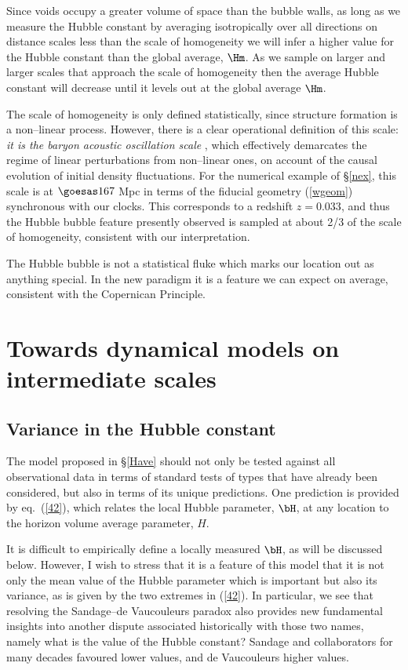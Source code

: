 \documentclass[12pt]{iopart}
\begin{document}
Since voids occupy a greater volume of space than the bubble walls, as
long as we measure the Hubble constant by averaging isotropically over all
directions on distance scales less than the scale of homogeneity we will
infer a higher value for the Hubble constant than the global average, $\Hm$.
As we sample on larger and larger scales that approach the scale of homogeneity
then the average Hubble constant will decrease until it levels out at
the global average $\Hm$.

The scale of homogeneity is only defined statistically, since structure
formation is a non--linear process. However, there is a clear operational
definition of this scale: {\em it is the baryon acoustic oscillation scale}
\cite{bao}, which effectively demarcates the regime of linear
perturbations from non--linear ones, on account of the causal evolution
of initial density fluctuations. For the numerical example of \S\ref{nex},
this scale is at $\goesas167$ Mpc in terms of the fiducial geometry
(\ref{wgeom}) synchronous with our clocks. This corresponds to a redshift
$z=0.033$, and thus the Hubble bubble feature presently observed is
sampled at about 2/3 of the scale of homogeneity, consistent with our
interpretation.

The Hubble bubble is not a statistical fluke which marks our location
out as anything special. In the new paradigm it is a feature we can
expect on average, consistent with the Copernican Principle.

\section{Towards dynamical models on intermediate scales\label{Newton}}

\subsection{Variance in the Hubble constant}

The model proposed in \S\ref{Have} should not only be tested against
all observational data in terms of standard tests of types that have
already been considered, but also in terms of its unique predictions.
One prediction is provided by eq.\ (\ref{42}), which relates
the local Hubble parameter, $\bH$, at any location to the
horizon volume average parameter, $H$.

It is difficult to empirically define a locally measured $\bH$, as will
be discussed below. However, I wish to stress that it is a feature of
this model that it is not only the mean value of the Hubble parameter
which is important but also its variance, as is given by the two
extremes in (\ref{42}).
In particular, we see that resolving the Sandage--de Vaucouleurs
paradox also provides new fundamental insights into another dispute
associated historically with those two names, namely what is the value of
the Hubble constant? Sandage and collaborators for many decades favoured
lower values, and de Vaucouleurs higher values.
\end{document}
